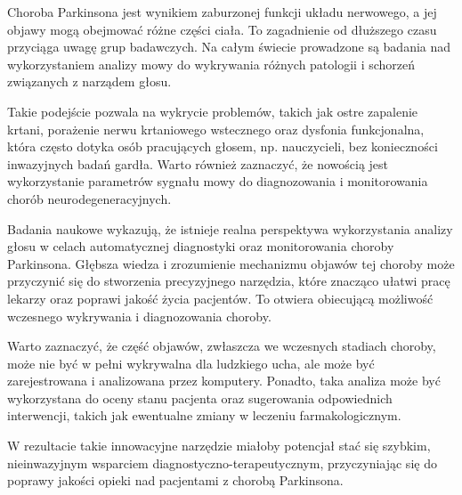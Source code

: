 Choroba Parkinsona jest wynikiem zaburzonej funkcji układu nerwowego, a jej objawy mogą obejmować różne części ciała.
To zagadnienie od dłuższego czasu przyciąga uwagę grup badawczych.
Na całym świecie prowadzone są badania nad wykorzystaniem analizy mowy do wykrywania różnych patologii i schorzeń związanych z narządem głosu.

Takie podejście pozwala na wykrycie problemów, takich jak ostre zapalenie krtani, porażenie nerwu krtaniowego wstecznego oraz dysfonia funkcjonalna,
która często dotyka osób pracujących głosem, np. nauczycieli, bez konieczności inwazyjnych badań gardła. Warto również zaznaczyć, że nowością
jest wykorzystanie parametrów sygnału mowy do diagnozowania i monitorowania chorób neurodegeneracyjnych.

Badania naukowe wykazują, że istnieje realna perspektywa wykorzystania analizy głosu w celach automatycznej diagnostyki oraz monitorowania choroby Parkinsona.
Głębsza wiedza i zrozumienie mechanizmu objawów tej choroby może przyczynić się do stworzenia precyzyjnego narzędzia, które znacząco ułatwi pracę lekarzy
oraz poprawi jakość życia pacjentów.
To otwiera obiecującą możliwość wczesnego wykrywania i diagnozowania choroby.

Warto zaznaczyć, że część objawów, zwłaszcza we wczesnych stadiach choroby, może nie być w pełni wykrywalna dla ludzkiego ucha, ale może być
zarejestrowana i analizowana przez komputery.
Ponadto, taka analiza może być wykorzystana do oceny stanu pacjenta oraz sugerowania odpowiednich interwencji, takich jak ewentualne zmiany w
leczeniu farmakologicznym.

W rezultacie takie innowacyjne narzędzie miałoby potencjał stać się szybkim, nieinwazyjnym wsparciem diagnostyczno-terapeutycznym,
przyczyniając się do poprawy jakości opieki nad pacjentami z chorobą Parkinsona.